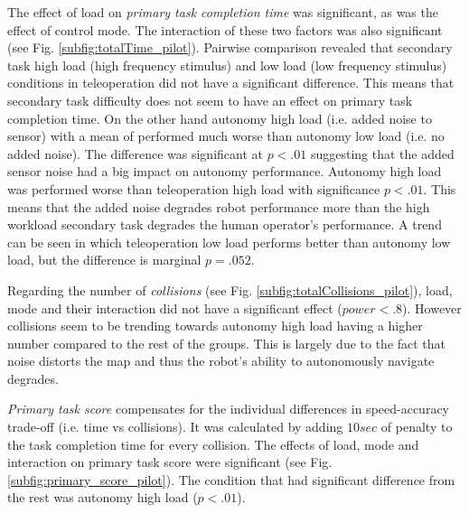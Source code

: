 \documentclass[a4paper,12pt,oneside,openright]{bhamthesis}
\begin{document}
The effect of load on \textit{primary task completion time} was significant, as was the effect of control mode. The interaction of these two factors was also significant (see Fig. \ref{subfig:totalTime_pilot}). Pairwise comparison revealed that secondary task high load (high frequency stimulus) and low load (low frequency stimulus) conditions in teleoperation did not have a significant difference. This means that secondary task difficulty does not seem to have an effect on primary task completion time. On the other hand autonomy high load (i.e. added noise to sensor) with a mean of performed much worse than autonomy low load (i.e. no added noise). The difference was significant at \textit{$p <.01$} suggesting that the added sensor noise had a big impact on autonomy performance. Autonomy high load was performed worse than teleoperation high load with significance \textit{$p < .01$}. This means that the added noise degrades robot performance more than the high workload secondary task degrades the human operator's performance. A trend can be seen in which teleoperation low load performs better than autonomy low load, but the difference is marginal \textit{$p = .052$}. 

Regarding the number of \textit{collisions} (see Fig. \ref{subfig:totalCollisions_pilot}), load, mode and their interaction did not have a significant effect (\textit{$power < .8$}). However collisions seem to be trending towards autonomy high load having a higher number compared to the rest of the groups. This is largely due to the fact that noise distorts the map and thus the robot's ability to autonomously navigate degrades.  

\textit{Primary task score} compensates for the individual differences in speed-accuracy trade-off (i.e. time vs collisions). It was calculated by adding \textit{$10 sec$} of penalty to the task completion time for every collision. The effects of load, mode and interaction on primary task score were significant (see Fig. \ref{subfig:primary_score_pilot}). The condition that had significant difference from the rest was autonomy high load (\textit{$p < .01$}).
 
\end{document}
